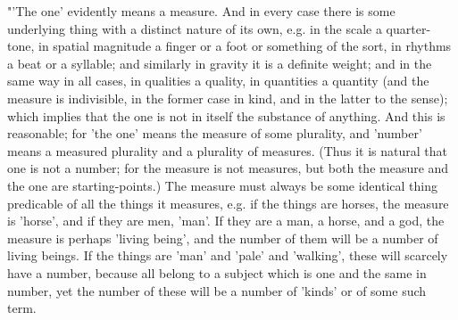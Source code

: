 "'The one' evidently means a measure. And in every case there is some
underlying thing with a distinct nature of its own, e.g. in the scale
a quarter-tone, in spatial magnitude a finger or a foot or something
of the sort, in rhythms a beat or a syllable; and similarly in gravity
it is a definite weight; and in the same way in all cases, in qualities
a quality, in quantities a quantity (and the measure is indivisible,
in the former case in kind, and in the latter to the sense); which
implies that the one is not in itself the substance of anything. And
this is reasonable; for 'the one' means the measure of some plurality,
and 'number' means a measured plurality and a plurality of measures.
(Thus it is natural that one is not a number; for the measure is not
measures, but both the measure and the one are starting-points.) The
measure must always be some identical thing predicable of all the
things it measures, e.g. if the things are horses, the measure is
'horse', and if they are men, 'man'. If they are a man, a horse, and
a god, the measure is perhaps 'living being', and the number of them
will be a number of living beings. If the things are 'man' and 'pale'
and 'walking', these will scarcely have a number, because all belong
to a subject which is one and the same in number, yet the number of
these will be a number of 'kinds' or of some such term. 

